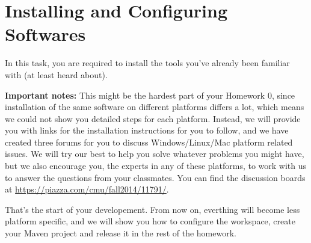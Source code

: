 
\chapter{Installing and Configuring Softwares}

In this task, you are required to install the tools you've already been familiar
with (at least heard about).

\textbf{Important notes:} This might be the hardest part of your Homework 0,
since installation of the same software on different platforms differs a lot,
which means we could not show you detailed steps for each platform. Instead, we
will provide you with links for the installation instructions for you to follow,
and we have created three forums for you to discuss Windows/Linux/Mac platform
related issues. We will try our best to help you solve whatever problems you
might have, but we also encourage you, the experts in any of these platforms, to
work with us to answer the questions from your classmates. You can find the
discussion boards at \url{https://piazza.com/cmu/fall2014/11791/}.









That's the start of your developement. From now on, everthing will become less
platform specific, and we will show you how to configure the workspace, create
your Maven project and release it in the rest of the homework.


